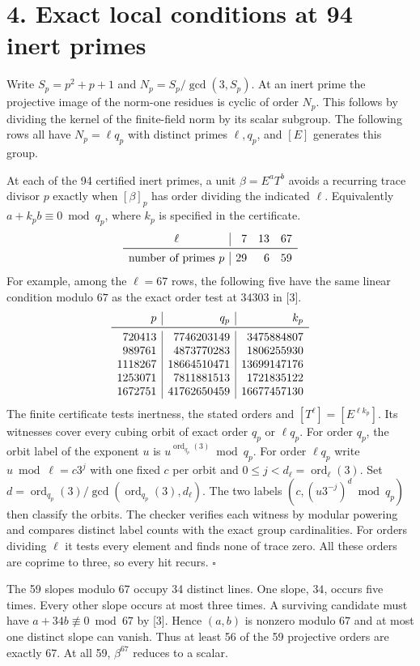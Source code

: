 \documentclass[11pt,a4paper,oneside,openany]{book}
\newcommand{\localhead}[1]{\needspace{5\baselineskip}\section*{\color{ink}#1}}
\let\sect\localhead\let\secx\localhead\let\head\localhead
\begin{document}
\sect{4. Exact local conditions at 94 inert primes}
Write $S_p=p^2+p+1$ and $N_p=S_p/\gcd(3,S_p)$. At an inert prime the projective image of the norm-one residues is cyclic of order $N_p$. This follows by dividing the kernel of the finite-field norm by its scalar subgroup. The following rows all have $N_p=\ell q_p$ with distinct primes $\ell,q_p$, and $[E]$ generates this group.

 At each of the 94 certified inert primes, a unit $\beta=E^aT^b$ avoids a recurring trace divisor $p$ exactly when $[\beta]_p$ has order dividing the indicated $\ell$. Equivalently $a+k_pb\equiv0\bmod q_p$, where $k_p$ is specified in the certificate.
\[
\begin{array}{c|rrr}
\ell&7&13&67\\\midrule
\text{number of primes }p&29&6&59
\end{array}
\]
For example, among the $\ell=67$ rows, the following five have the same linear condition modulo $67$ as the exact order test at $34303$ in [3].
\[
\begin{array}{r|r|r}
p&q_p&k_p\\\midrule
720413&7746203149&3475884807\\
989761&4873770283&1806255930\\
1118267&18664510471&13699147176\\
1253071&7811881513&1721835122\\
1672751&41762650459&16677457130
\end{array}
\]
 The finite certificate tests inertness, the stated orders and $[T^\ell]=[E^{\ell k_p}]$. Its witnesses cover every cubing orbit of exact order $q_p$ or $\ell q_p$. For order $q_p$, the orbit label of the exponent $u$ is $u^{\operatorname{ord}_{q_p}(3)}\bmod q_p$. For order $\ell q_p$ write $u\bmod\ell=c3^j$ with one fixed $c$ per orbit and $0\le j<d_\ell=\operatorname{ord}_\ell(3)$. Set $d=\operatorname{ord}_{q_p}(3)/\gcd(\operatorname{ord}_{q_p}(3),d_\ell)$. The two labels $(c,(u3^{-j})^d\bmod q_p)$ then classify the orbits. The checker verifies each witness by modular powering and compares distinct label counts with the exact group cardinalities. For orders dividing $\ell$ it tests every element and finds none of trace zero. All these orders are coprime to three, so every hit recurs. \hfill$\square$

 The 59 slopes modulo $67$ occupy 34 distinct lines. One slope, $34$, occurs five times. Every other slope occurs at most three times. A surviving candidate must have $a+34b\not\equiv0\bmod67$ by [3]. Hence $(a,b)$ is nonzero modulo $67$ and at most one distinct slope can vanish. Thus at least 56 of the 59 projective orders are exactly $67$. At all 59, $\beta^{67}$ reduces to a scalar.
\end{document}
